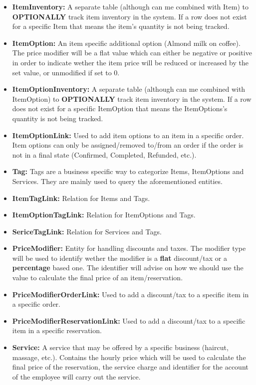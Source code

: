 \documentclass[11pt,a4paper,pdftex]{article}
\begin{document}
\begin{itemize}
    \item \textbf{ItemInventory:} A separate table (although can me combined with Item) to \textbf{OPTIONALLY} track item inventory in the system. If a row does not exist for a specific Item that means the item's quantity is not being tracked.
    \item \textbf{ItemOption:} An item specific additional option (Almond milk on coffee). The price modifier will be a flat value which can either be negative or positive in order to indicate wether the item price will be reduced or increased by the set value, or unmodified if set to 0.
    \item \textbf{ItemOptionInventory:} A separate table (although can me combined with ItemOption) to \textbf{OPTIONALLY} track item inventory in the system. If a row does not exist for a specific ItemOption that means the ItemOptions's quantity is not being tracked.
    \item \textbf{ItemOptionLink:} Used to add item options to an item in a specific order. Item options can only be assigned/removed to/from an order if the order is not in a final state (Confirmed, Completed, Refunded, etc.).
    \item \textbf{Tag:} Tags are a business specific way to categorize Items, ItemOptions and Services. They are mainly used to query the aforementioned entities.
    \item \textbf{ItemTagLink:} Relation for Items and Tags.
    \item \textbf{ItemOptionTagLink:} Relation for ItemOptions and Tags.
    \item \textbf{SericeTagLink:} Relation for Services and Tags.
    \item \textbf{PriceModifier:} Entity for handling discounts and taxes. The modifier type will be used to identify wether the modifier is a \textbf{flat} discount/tax or a \textbf{percentage} based one. The identifier will advise on how we should use the value to calculate the final price of an item/reservation.
    \item \textbf{PriceModifierOrderLink:} Used to add a discount/tax to a specific item in a specific order.
    \item \textbf{PriceModifierReservationLink:} Used to add a discount/tax to a specific item in a specific reservation.
    \item \textbf{Service:} A service that may be offered by a specific business (haircut, massage, etc.). Contains the hourly price which will be used to calculate the final price of the reservation, the service charge and identifier for the account of the employee will carry out the service.

\end{itemize}
\end{document}
